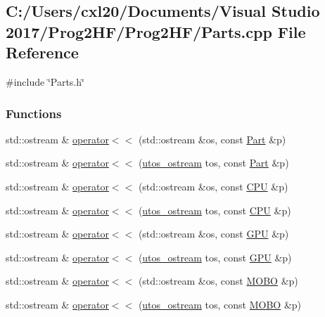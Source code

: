 \subsection{C\+:/\+Users/cxl20/\+Documents/\+Visual Studio 2017/\+Prog2\+H\+F/\+Prog2\+H\+F/\+Parts.cpp File Reference}
\label{_parts_8cpp}
{\ttfamily \#include \char`\"{}Parts.\+h\char`\"{}}\newline
\subsubsection*{Functions}
\begin{DoxyCompactItemize}
\item 
std\+::ostream \& \mbox{\hyperlink{_parts_8cpp_a545350ed97c61e94aefe4fff919dd749}{operator$<$$<$}} (std\+::ostream \&os, const \mbox{\hyperlink{class_part}{Part}} \&p)
\item 
std\+::ostream \& \mbox{\hyperlink{_parts_8cpp_adbf3d6a04840d73851e882509f7a9ac7}{operator$<$$<$}} (\mbox{\hyperlink{structutos__ostream}{utos\+\_\+ostream}} tos, const \mbox{\hyperlink{class_part}{Part}} \&p)
\item 
std\+::ostream \& \mbox{\hyperlink{_parts_8cpp_a4e72844a8f5f9e999222fcd2ce889cc6}{operator$<$$<$}} (std\+::ostream \&os, const \mbox{\hyperlink{class_c_p_u}{C\+PU}} \&p)
\item 
std\+::ostream \& \mbox{\hyperlink{_parts_8cpp_a46ef2ba811c1130da70a422ffaaef5be}{operator$<$$<$}} (\mbox{\hyperlink{structutos__ostream}{utos\+\_\+ostream}} tos, const \mbox{\hyperlink{class_c_p_u}{C\+PU}} \&p)
\item 
std\+::ostream \& \mbox{\hyperlink{_parts_8cpp_a7b20bb2c543e3b9a7b73e788908a818d}{operator$<$$<$}} (std\+::ostream \&os, const \mbox{\hyperlink{class_g_p_u}{G\+PU}} \&p)
\item 
std\+::ostream \& \mbox{\hyperlink{_parts_8cpp_aef9dc14f6e2f85d7d17c9d333b496940}{operator$<$$<$}} (\mbox{\hyperlink{structutos__ostream}{utos\+\_\+ostream}} tos, const \mbox{\hyperlink{class_g_p_u}{G\+PU}} \&p)
\item 
std\+::ostream \& \mbox{\hyperlink{_parts_8cpp_a2692dd3fd4bb8169a98820ed4cb9e018}{operator$<$$<$}} (std\+::ostream \&os, const \mbox{\hyperlink{class_m_o_b_o}{M\+O\+BO}} \&p)
\item 
std\+::ostream \& \mbox{\hyperlink{_parts_8cpp_a910424cdc7f138e807c1f067a09fc0e6}{operator$<$$<$}} (\mbox{\hyperlink{structutos__ostream}{utos\+\_\+ostream}} tos, const \mbox{\hyperlink{class_m_o_b_o}{M\+O\+BO}} \&p)

\end{DoxyCompactItemize}
